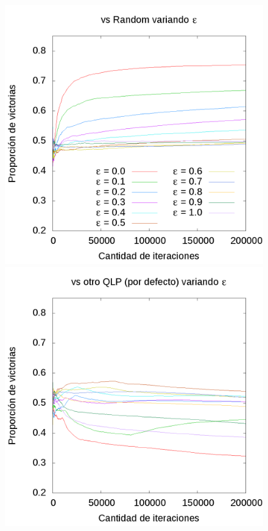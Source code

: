 \documentclass[10pt, a4paper]{article}
\begin{document}
\begin{figure}[ht]
  \begin{minipage}[c]{1\textwidth}
	\includegraphics[scale=0.32]{EpsilonR.png}
	\includegraphics[scale=0.32]{EpsilonQ.png}
  \end{minipage}
\end{figure}
\end{document}
